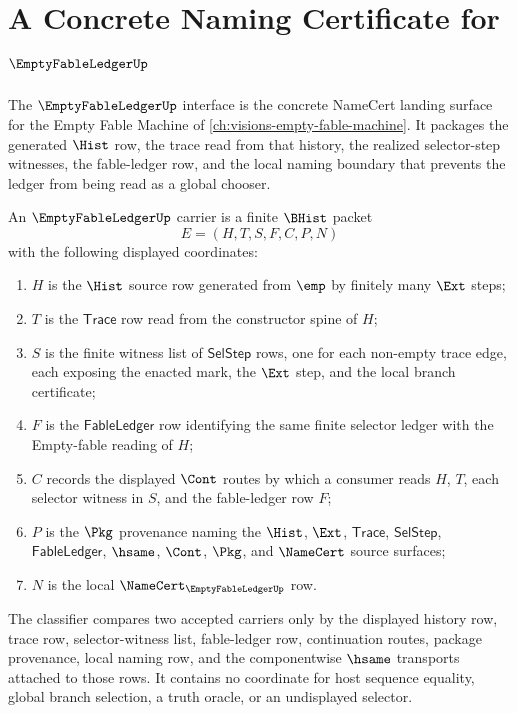 \chapter{A Concrete Naming Certificate for $\EmptyFableLedgerUp$}
\label{ch:concrete-instances-empty-fable-ledger-namecert}

The $\EmptyFableLedgerUp$ interface is the concrete NameCert landing surface for the Empty Fable Machine of \autoref{ch:visions-empty-fable-machine}. It packages the generated $\Hist$ row, the trace read from that history, the realized selector-step witnesses, the fable-ledger row, and the local naming boundary that prevents the ledger from being read as a global chooser.

\begin{definition}
\label{def:empty-fable-ledger-namecert-carrier}
An $\EmptyFableLedgerUp$ carrier is a finite $\BHist$ packet
$$
E=(H,T,S,F,C,P,N)
$$
with the following displayed coordinates:
\begin{enumerate}
\item $H$ is the $\Hist$ source row generated from $\emp$ by finitely many $\Ext$ steps;
\item $T$ is the $\mathsf{Trace}$ row read from the constructor spine of $H$;
\item $S$ is the finite witness list of $\mathsf{SelStep}$ rows, one for each non-empty trace edge, each exposing the enacted mark, the $\Ext$ step, and the local branch certificate;
\item $F$ is the $\mathsf{FableLedger}$ row identifying the same finite selector ledger with the Empty-fable reading of $H$;
\item $C$ records the displayed $\Cont$ routes by which a consumer reads $H$, $T$, each selector witness in $S$, and the fable-ledger row $F$;
\item $P$ is the $\Pkg$ provenance naming the $\Hist$, $\Ext$, $\mathsf{Trace}$, $\mathsf{SelStep}$, $\mathsf{FableLedger}$, $\hsame$, $\Cont$, $\Pkg$, and $\NameCert$ source surfaces;
\item $N$ is the local $\NameCert_{\EmptyFableLedgerUp}$ row.
\end{enumerate}
The classifier compares two accepted carriers only by the displayed history row, trace row, selector-witness list, fable-ledger row, continuation routes, package provenance, local naming row, and the componentwise $\hsame$ transports attached to those rows. It contains no coordinate for host sequence equality, global branch selection, a truth oracle, or an undisplayed selector.
\end{definition}

